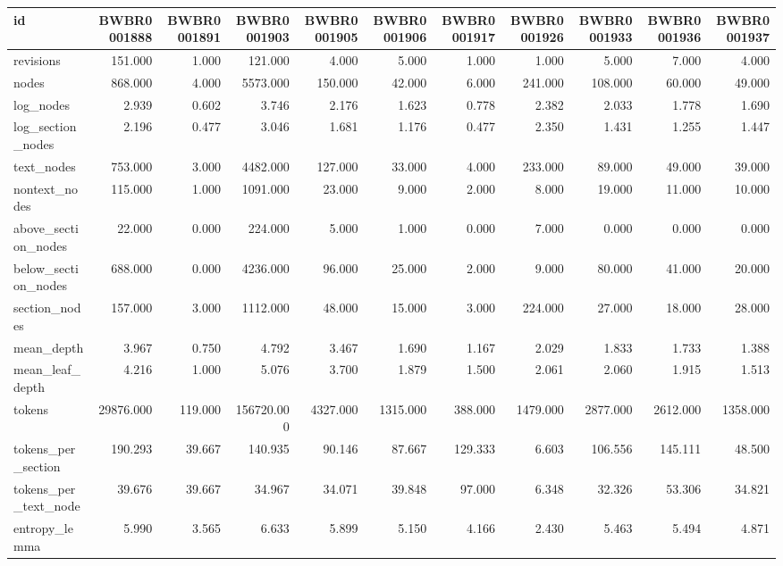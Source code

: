 \begin{tabular}{lrrrrrrrrrr}
\toprule
id & BWBR0001888 & BWBR0001891 & BWBR0001903 & BWBR0001905 & BWBR0001906 & BWBR0001917 & BWBR0001926 & BWBR0001933 & BWBR0001936 & BWBR0001937 \\
\midrule
revisions & 151.000 & 1.000 & 121.000 & 4.000 & 5.000 & 1.000 & 1.000 & 5.000 & 7.000 & 4.000 \\
\cline{1-11}
nodes & 868.000 & 4.000 & 5573.000 & 150.000 & 42.000 & 6.000 & 241.000 & 108.000 & 60.000 & 49.000 \\
\cline{1-11}
log\_nodes & 2.939 & 0.602 & 3.746 & 2.176 & 1.623 & 0.778 & 2.382 & 2.033 & 1.778 & 1.690 \\
\cline{1-11}
log\_section\_nodes & 2.196 & 0.477 & 3.046 & 1.681 & 1.176 & 0.477 & 2.350 & 1.431 & 1.255 & 1.447 \\
\cline{1-11}
text\_nodes & 753.000 & 3.000 & 4482.000 & 127.000 & 33.000 & 4.000 & 233.000 & 89.000 & 49.000 & 39.000 \\
\cline{1-11}
nontext\_nodes & 115.000 & 1.000 & 1091.000 & 23.000 & 9.000 & 2.000 & 8.000 & 19.000 & 11.000 & 10.000 \\
\cline{1-11}
above\_section\_nodes & 22.000 & 0.000 & 224.000 & 5.000 & 1.000 & 0.000 & 7.000 & 0.000 & 0.000 & 0.000 \\
\cline{1-11}
below\_section\_nodes & 688.000 & 0.000 & 4236.000 & 96.000 & 25.000 & 2.000 & 9.000 & 80.000 & 41.000 & 20.000 \\
\cline{1-11}
section\_nodes & 157.000 & 3.000 & 1112.000 & 48.000 & 15.000 & 3.000 & 224.000 & 27.000 & 18.000 & 28.000 \\
\cline{1-11}
mean\_depth & 3.967 & 0.750 & 4.792 & 3.467 & 1.690 & 1.167 & 2.029 & 1.833 & 1.733 & 1.388 \\
\cline{1-11}
mean\_leaf\_depth & 4.216 & 1.000 & 5.076 & 3.700 & 1.879 & 1.500 & 2.061 & 2.060 & 1.915 & 1.513 \\
\cline{1-11}
tokens & 29876.000 & 119.000 & 156720.000 & 4327.000 & 1315.000 & 388.000 & 1479.000 & 2877.000 & 2612.000 & 1358.000 \\
\cline{1-11}
tokens\_per\_section & 190.293 & 39.667 & 140.935 & 90.146 & 87.667 & 129.333 & 6.603 & 106.556 & 145.111 & 48.500 \\
\cline{1-11}
tokens\_per\_text\_node & 39.676 & 39.667 & 34.967 & 34.071 & 39.848 & 97.000 & 6.348 & 32.326 & 53.306 & 34.821 \\
\cline{1-11}
entropy\_lemma & 5.990 & 3.565 & 6.633 & 5.899 & 5.150 & 4.166 & 2.430 & 5.463 & 5.494 & 4.871 \\

\end{tabular}
